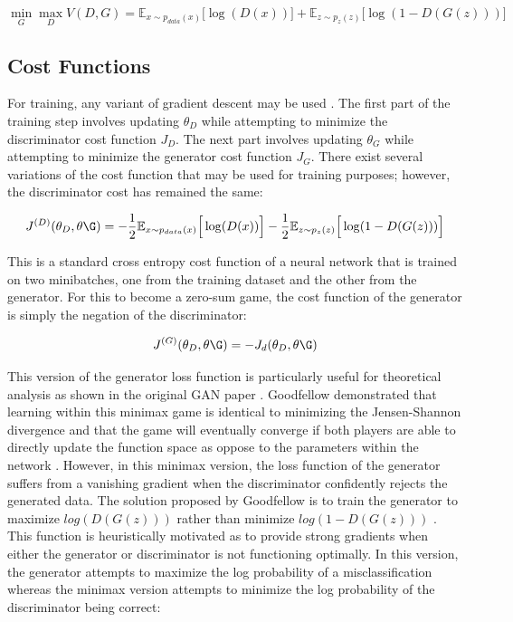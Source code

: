 \documentclass[11pt]{article}
\begin{document}
$$\min_{G}\max_{D}V(D, G) = \mathbb{E}_{x\sim p_{data}(x)}\Big[\log(D(x))\Big] + \mathbb{E}_{z\sim p_z(z)}\Big[\log(1-D(G(z)))\Big]$$

\subsection{Cost Functions}
For training, any variant of gradient descent may be used \citep{2017arXiv170100160G}. The first part of the training step involves updating $\theta_D$ while attempting to minimize the discriminator cost function $J_D$. The next part involves updating $\theta_G$ while attempting to minimize the generator cost function $J_G$. There exist several variations of the cost function that may be used for training purposes; however, the discriminator cost has remained the same:

$$J^{(D)}(\theta_D,\theta\G) = -\frac{1}{2}\mathbb{E}_{x\sim p_{data}(x)}\Big[\log(D(x))\Big] - \frac{1}{2}\mathbb{E}_{z\sim p_{z}(z)}\Big[\log(1-D(G(z)))\Big]$$

This is a standard cross entropy cost function of a neural network that is trained on two minibatches, one from the training dataset and the other from the generator. For this to become a zero-sum game, the cost function of the generator is simply the negation of the discriminator:

$$J^{(G)}(\theta_D,\theta\G) = -J_d(\theta_D,\theta\G)$$

This version of the generator loss function is particularly useful for theoretical analysis as shown in the original GAN paper \citep{2014arXiv1406.2661G}. Goodfellow demonstrated that learning within this minimax game is identical to minimizing the Jensen-Shannon divergence and that the game will eventually converge if both players are able to directly update the function space as oppose to the parameters within the network \citep{2017arXiv170100160G}. However, in this minimax version, the loss function of the generator suffers from a vanishing gradient when the discriminator confidently rejects the generated data. The solution proposed by Goodfellow is to train the generator to maximize $log(D(G(z)))$ rather than minimize $log(1-D(G(z)))$ \citep{2014arXiv1406.2661G}. This function is heuristically motivated as to provide strong gradients when either the generator or discriminator is not functioning optimally. In this version, the generator attempts to maximize the log probability of a misclassification whereas the minimax version attempts to minimize the log probability of the discriminator being correct:
\end{document}
